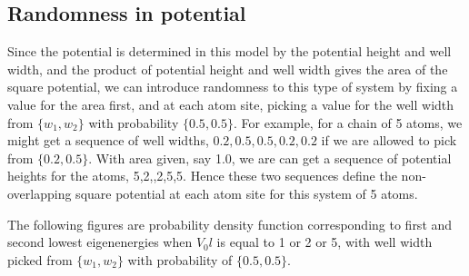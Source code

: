 \subsection{Randomness in potential}\label{Randomness in potential}
Since the potential is determined in this model by the potential height and well width, and the product of potential height and well width gives the area of the square potential, we can introduce randomness to this type of system by fixing a value for the area first, and at each atom site, picking a value for the well width from $\{w_1,w_2\}$ with probability $\{0.5,0.5\}$.  For example, for a chain of 5 atoms, we might get a sequence of well widths, ${0.2,0.5,0.5,0.2,0.2}$ if we are allowed to pick from $\{0.2,0.5\}$. With area given, say 1.0, we are can get a sequence of potential heights for the atoms, {5,2,,2,5,5}. Hence these two sequences define the non-overlapping square potential at each atom site for this system of 5 atoms. 

The following figures are probability density function corresponding to first and second lowest eigenenergies when $V_0l$ is equal to 1 or 2 or 5, with well width picked from $\{w_1,w_2\}$ with probability of $\{0.5,0.5\}$.



